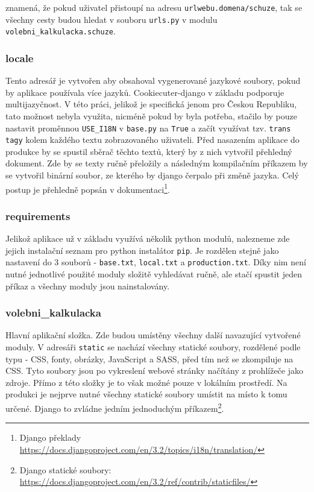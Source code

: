 znamená, že pokud uživatel přistoupí na adresu \texttt{urlwebu.domena/schuze}, tak se všechny cesty budou hledat v souboru \texttt{urls.py} v modulu \texttt{volebni\_kalkulacka.schuze}.

\subsubsection{locale}
Tento adresář je vytvořen aby obsahoval vygenerované jazykové soubory, pokud by aplikace používala více jazyků. Cookiecuter-django v základu podporuje multijazyčnost. V této práci, jelikož je specifická jenom pro Českou Republiku, tato možnost nebyla využita, nicméně pokud by byla potřeba, stačilo by pouze nastavit proměnnou \texttt{USE\_I18N} v \texttt{base.py} na \texttt{True} a začít využívat tzv. \texttt{trans tagy} kolem každého textu zobrazovaného uživateli. Před nasazením aplikace do produkce by se spustil sběrač těchto textů, který by z nich vytvořil přehledný dokument. Zde by se texty ručně přeložily a následným kompilačním příkazem by se vytvořil binární soubor, ze kterého by django čerpalo při změně jazyka. Celý postup je přehledně popsán v dokumentaci\footnote{Django překlady \url{https://docs.djangoproject.com/en/3.2/topics/i18n/translation/}}.

\subsubsection{requirements}
Jelikož aplikace už v základu využívá několik python modulů, nalezneme zde jejich instalační seznam pro python instalátor \texttt{pip}. Je rozdělen stejně jako nastavení do 3 souborů - \texttt{base.txt}, \texttt{local.txt} a \texttt{production.txt}. Díky nim není nutné jednotlivé použité moduly složitě vyhledávat ručně, ale stačí spustit jeden příkaz a všechny moduly jsou nainstalovány.

\subsubsection{volebni\_kalkulacka}
Hlavní aplikační složka. Zde budou umístěny všechny další navazující vytvořené moduly. V adresáři \texttt{static} se nachází všechny statické soubory, rozdělené podle typu - CSS, fonty, obrázky, JavaScript a SASS, před tím než se zkompiluje na CSS. Tyto soubory jsou po vykreslení webové stránky načítány z prohlížeče jako zdroje. Přímo z této složky je to však možné pouze v lokálním prostředí. Na produkci je nejprve nutné všechny statické soubory umístit na místo k tomu určené. Django to zvládne jedním jednoduchým příkazem\footnote{Django statické soubory: \url{https://docs.djangoproject.com/en/3.2/ref/contrib/staticfiles/}}.

